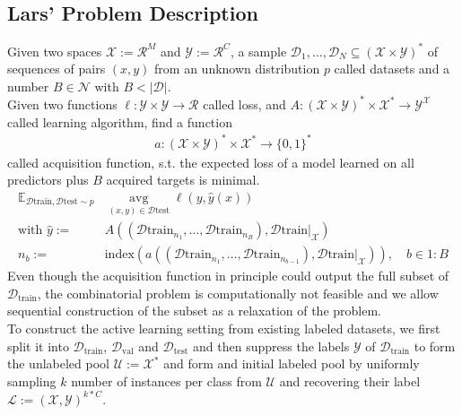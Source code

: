 \documentclass[]{article}
\begin{document}
\subsection{Lars' Problem Description}
Given two spaces $\mathcal{X}:=\mathcal{R}^M$ and $\mathcal{Y}:=\mathcal{R}^C$, a sample $\mathcal{D}_1,\ldots,\mathcal{D}_N \subseteq (\mathcal{X}\times \mathcal{Y})^*$ of sequences of pairs $(x,y)$  from an unknown distribution $p$ called datasets and a number $B\in\mathcal{N}$ with $B < |\mathcal{D}|$. \\
Given two functions $\ell:\mathcal{Y}\times \mathcal{Y}\rightarrow \mathcal{R}$ called loss, and $A: (\mathcal{X} \times \mathcal{Y})^* \times \mathcal{X}^* \rightarrow \mathcal{Y}^{\mathcal{X}}$ called learning algorithm, find a function
\begin{align*}
	a: (\mathcal{X}\times \mathcal{Y})^* \times \mathcal{X}^* \rightarrow \{0,1\}^*
\end{align*}
called acquisition function, s.t. the expected loss of a model learned on all predictors plus $B$ acquired targets is minimal.
\begin{align*}
	\mathbb{E}_{\mathcal{D}\text{train},\mathcal{D}\text{test}\sim p}   &
	\operatorname{avg}\limits_{(x,y)\in\mathcal{D}\text{test}}
	\ell(y, \hat y(x)) 
	\\
	\text{with }
	\hat y:= & A( (\mathcal{D}\text{train}_{n_1},\ldots,\mathcal{D}\text{train}_{n_B}), \mathcal{D}\text{train}|_{\mathcal{X}})
	\\ 
	n_b := & \text{index}( a( (\mathcal{D}\text{train}_{n_1},\ldots,\mathcal{D}\text{train}_{n_{b-1}}), \mathcal{D}\text{train}|_{\mathcal{X}}) ),
	\quad b\in 1{:}B
\end{align*}
Even though the acquisition function in principle could output the full subset of $\mathcal{D}_\text{train}$, the combinatorial problem is computationally not feasible and we allow sequential construction of the subset as a relaxation of the problem. \\
%
To construct the active learning setting from existing labeled datasets, we first split it into $\mathcal{D}_\text{train}$, $\mathcal{D}_\text{val}$ and $\mathcal{D}_\text{test}$ and then suppress the labels $\mathcal{Y}$ of $\mathcal{D}_\text{train}$ to form the unlabeled pool $\mathcal{U} := \mathcal{X}^*$ and form and initial labeled pool by uniformly sampling $k$ number of instances per class from $\mathcal{U}$ and recovering their label $\mathcal{L} := (\mathcal{X}, \mathcal{Y})^{k*C}$. \\
\end{document}
